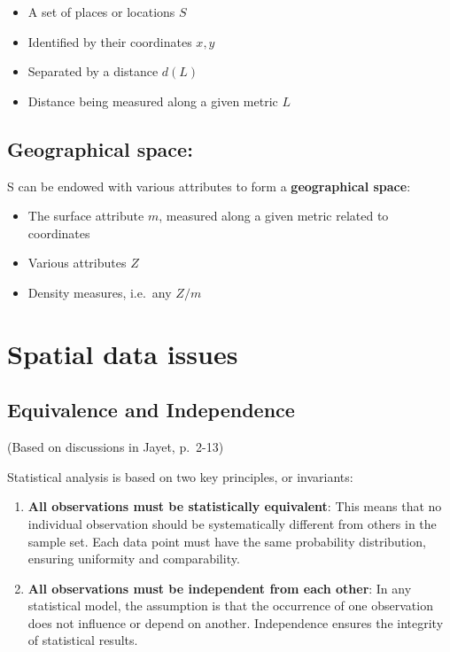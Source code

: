 \documentclass[
  letterpaper,
  DIV=11,
  numbers=noendperiod]{scrreprt}
\providecommand{\tightlist}{%
  \setlength{\itemsep}{0pt}\setlength{\parskip}{0pt}}\usepackage{longtable,booktabs,array}
\begin{document}
\begin{itemize}
\tightlist
\item
  A set of places or locations \(S\)
\item
  Identified by their coordinates \(x,y\)
\item
  Separated by a distance \(d(L)\)
\item
  Distance being measured along a given metric \(L\)
\end{itemize}

\section{Geographical space:}\label{geographical-space}

S can be endowed with various attributes to form a \textbf{geographical
space}:

\begin{itemize}
\item
  The surface attribute \(m\), measured along a given metric related to
  coordinates
\item
  Various attributes \(Z\)
\item
  Density measures, i.e.~any \(Z/m\)
\end{itemize}

\chapter{Spatial data issues}\label{sec-spatial-data-issues}

\section{Equivalence and
Independence}\label{equivalence-and-independence}

(Based on discussions in Jayet, p.~2-13)

Statistical analysis is based on two key principles, or invariants:

\begin{enumerate}
\def\labelenumi{\arabic{enumi}.}
\item
  \textbf{All observations must be statistically equivalent}: This means
  that no individual observation should be systematically different from
  others in the sample set. Each data point must have the same
  probability distribution, ensuring uniformity and comparability.
\item
  \textbf{All observations must be independent from each other}: In any
  statistical model, the assumption is that the occurrence of one
  observation does not influence or depend on another. Independence
  ensures the integrity of statistical results.
\end{enumerate}
\end{document}
